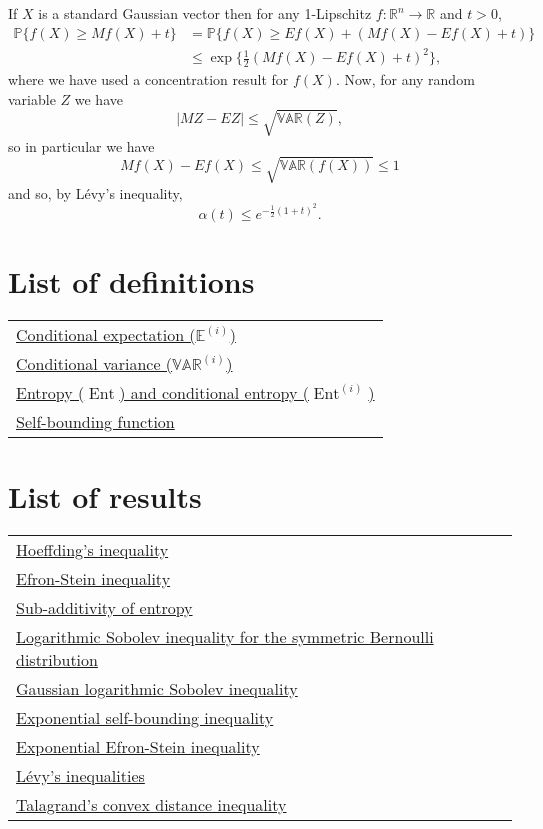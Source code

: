 \documentclass[reqno]{amsproc}
\newcommand{\R}{\mathbb{R}}
\renewcommand{\P}{\mathbb{P}} %
\newcommand{\E}{\mathbb{E}} %
\newcommand{\var}{\mathbb{VAR}} %
\DeclareMathOperator{\Ent}{Ent} %
\begin{document}
	If $X$ is a standard Gaussian vector then for any 1-Lipschitz $f: \R^n \to \R$ and $t > 0$,
	\begin{align*}
	\P \{ f(X) \geq Mf(X) + t \} &= \P \{ f(X) \geq Ef(X) + (Mf(X) - Ef(X) + t) \} \\
	& \leq \exp \bigg\{ \frac{1}{2}(Mf(X) - Ef(X) + t)^2\bigg\},
	\end{align*}
	where we have used a concentration result for $f(X)$. Now, for any random variable $Z$ we have
	\[|MZ - EZ| \leq \sqrt{\var(Z)},\]
	so in particular we have
	\[ Mf(X) - Ef(X) \leq \sqrt{\var(f(X))} \leq 1\]
	and so, by L\'evy's inequality,
	\[ \alpha(t) \leq e^{-\frac{1}{2}(1+t)^2}. \]


\appendix
\newpage


\section*{List of definitions}
	\begin{tabular}{l}
		\hyperref[thm:ESI]{Conditional expectation ($\E^{(i)}$)}\\
		\hyperref[thm:ESI]{Conditional variance ($\var^{(i)}$)}\\
		\hyperref[thm:sub_add_entropy]{Entropy ($\Ent$) and conditional entropy ($\Ent^{(i)}$)}\\
		\hyperref[thm:exp_self_bound_ineq]{Self-bounding function}
	\end{tabular}
\section*{List of results}
	\begin{tabular}{l}
		\hyperref[thm:hoeffding]{Hoeffding's inequality}\\
		\hyperref[thm:ESI]{Efron-Stein inequality}\\
		\hyperref[thm:sub_add_entropy]{Sub-additivity of entropy}\\
		\hyperref[thm:log_Sob_ineq_sym_Bernoulli]{Logarithmic Sobolev inequality for the symmetric Bernoulli distribution}\\
		\hyperref[thm:Gaussian_log_Sob_ineq]{Gaussian logarithmic Sobolev inequality}\\
		\hyperref[thm:sub_add_entropy]{Exponential self-bounding inequality}\\
		\hyperref[thm:exp_efron_stein]{Exponential Efron-Stein inequality}\\
		\hyperref[thm:levy]{L\'evy's inequalities}\\
		\hyperref[thm:tal]{Talagrand's convex distance inequality}
	\end{tabular}
\end{document}
